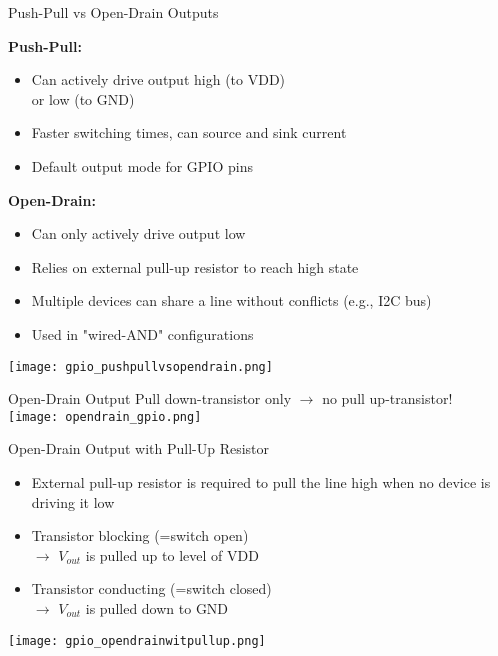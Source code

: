 \begin{theorem}{Push-Pull vs Open-Drain Outputs}

    \begin{minipage}{0.6\linewidth}
    \textbf{Push-Pull:}
    \begin{itemize}
        \item Can actively drive output high (to VDD) \\ or low (to GND)
        \item Faster switching times, can source and sink current
        \item Default output mode for GPIO pins
    \end{itemize}
    \textbf{Open-Drain:}
    \begin{itemize}
        \item Can only actively drive output low
        \item Relies on external pull-up resistor to reach high state
        \item Multiple devices can share a line without conflicts (e.g., I2C bus)
        \item Used in "wired-AND" configurations
    \end{itemize}
    \end{minipage}
    \begin{minipage}{0.4\linewidth}
    \texttt{[image: gpio\_pushpullvsopendrain.png]}
    \end{minipage}
\end{theorem}

\begin{corollary}{Open-Drain Output} 
    Pull down-transistor only $\rightarrow$ no pull up-transistor!\\
    \texttt{[image: opendrain\_gpio.png]}
\end{corollary}


\begin{corollary}{Open-Drain Output with Pull-Up Resistor}
    \begin{itemize}
        \item External pull-up resistor is required to pull the line high when no device is driving it low
        \item Transistor blocking (=switch open) \\ $\rightarrow$ $V_{out}$ is pulled up to level of VDD
        \item Transistor conducting (=switch closed) \\ $\rightarrow$ $V_{out}$ is pulled down to GND
    \end{itemize}
    \texttt{[image: gpio\_opendrainwitpullup.png]}
\end{corollary}

